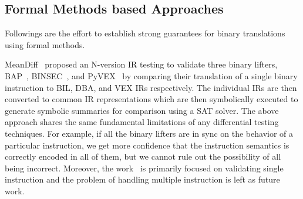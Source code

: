 % 
% 

\subsection{Formal Methods based Approaches}
Followings are the effort to establish strong guarantees for binary 
translations using formal methods.

MeanDiff~\cite{ASE2017} proposed an N-version IR testing to validate three
binary lifters, BAP~\cite{BAP:CAV11}, BINSEC~\cite{BINSEC2011}, and
PyVEX~\cite{PYVEX} by comparing their translation of a single binary
instruction to BIL, DBA, and VEX IRs respectively. The individual IRs are then 
converted to common IR representations which are then symbolically executed to 
generate symbolic summaries for comparison using a SAT solver.  The above 
approach shares the same fundamental limitations of any differential testing 
techniques. For example, if all the binary lifters are in  sync
on the behavior of a particular instruction, we get more confidence that the 
instruction semantics is correctly encoded in all of them, but we cannot rule 
out the possibility of all being incorrect. Moreover, the work~\cite{ASE2017} 
is primarily focused on validating single 
instruction and the problem 
of handling multiple instruction is left as future work.  

